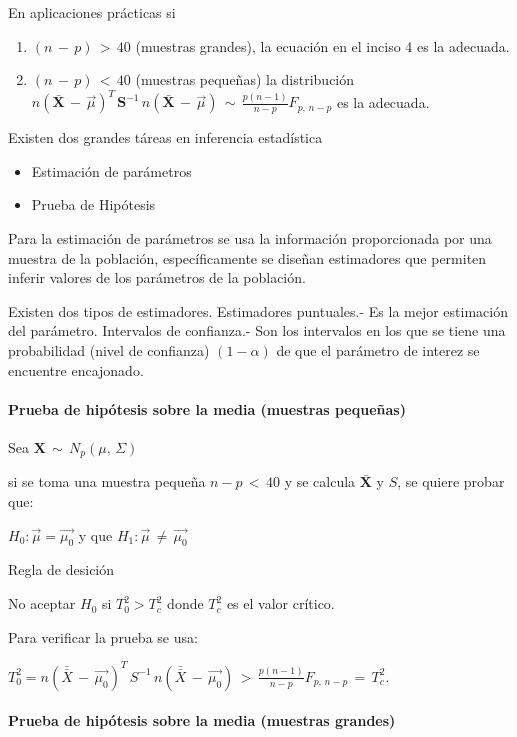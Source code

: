 \documentclass[english]{report}
\begin{document}
En aplicaciones prácticas si
\begin{enumerate}
\item $(n\,-\,p)\,>\, 40$ (muestras grandes), la ecuación en el inciso 4 es la adecuada.
\item $(n\,-\,p)\,<\, 40$ (muestras pequeñas) la distribución $n(\bar{\textbf{X}}\,-\,\vec{\mu})^T\,\textbf{S}^{-1}\,n(\bar{\textbf{X}}\,-\,\vec{\mu})\,\sim\, \frac{p(n-1)}{n-p}F_{p,\,n-p}$ es la adecuada.
\end{enumerate}

Existen dos grandes táreas en inferencia estadística

\begin{itemize}
\item Estimación de parámetros
\item Prueba de Hipótesis
\end{itemize}

Para la estimación de parámetros se usa la información proporcionada por una muestra de la población, específicamente se diseñan estimadores que permiten inferir valores de los parámetros de la población.

Existen dos tipos de estimadores.
Estimadores puntuales.- Es la mejor estimación del parámetro.
Intervalos de confianza.- Son los intervalos en los que se tiene una probabilidad (nivel de confianza) $(1-\alpha)$ de que el parámetro de interez se encuentre encajonado.

\paragraph{Prueba de hipótesis sobre la media (muestras pequeñas)}

Sea $\textbf{X}\,\sim\,N_p(\mu,\,\Sigma)$

si se toma una muestra pequeña $n-p\,<\,40$ y se calcula $\bar{ \textbf{X}}$ y $S$, se quiere probar que:

$H_0: \vec{\mu} = \vec{\mu_0}$ y que $H_1: \vec{\mu}\,\neq\,\vec{\mu_0}$  

Regla de desición 

No aceptar $H_0$ si $T_0^2 > T_c^2$ donde $T_c^2$ es el valor crítico.

Para verificar la prueba se usa:

$T_0^2 = n(\bar{\bar{X}}\,-\,\vec{\mu_0})^T\,S^{-1}\,n(\bar{\bar{X}}\,-\,\vec{\mu_0})\,>\, \frac{p(n-1)}{n-p}F_{p,\,n-p} \,=\,T_c^2$.

\paragraph{Prueba de hipótesis sobre la media (muestras grandes) }
\end{document}
